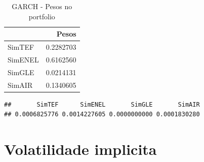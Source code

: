 \documentclass[
  12pt,
  a4paper,
  openany]{book}
\newenvironment{Shaded}{\begin{snugshade}}{\end{snugshade}}
\newcommand{\DataTypeTok}[1]{\textcolor[rgb]{0.13,0.29,0.53}{#1}}
\newcommand{\DecValTok}[1]{\textcolor[rgb]{0.00,0.00,0.81}{#1}}
\newcommand{\FloatTok}[1]{\textcolor[rgb]{0.00,0.00,0.81}{#1}}
\newcommand{\KeywordTok}[1]{\textcolor[rgb]{0.13,0.29,0.53}{\textbf{#1}}}
\newcommand{\NormalTok}[1]{#1}
\newcommand{\OperatorTok}[1]{\textcolor[rgb]{0.81,0.36,0.00}{\textbf{#1}}}
\newcommand{\StringTok}[1]{\textcolor[rgb]{0.31,0.60,0.02}{#1}}
\begin{document}
\normalsize

\begin{table}[!h]

\caption{\label{tab:unnamed-chunk-46}GARCH - Pesos no portfolio}
\centering
\begin{tabular}[t]{lr}
\toprule
  & Pesos\\
\midrule
SimTEF & 0.2282703\\
SimENEL & 0.6162560\\
SimGLE & 0.0214131\\
SimAIR & 0.1340605\\
\bottomrule
\end{tabular}
\end{table}

\scriptsize

\begin{Shaded}
\end{Shaded}

\begin{verbatim}
##       SimTEF      SimENEL       SimGLE       SimAIR 
## 0.0006825776 0.0014227605 0.0000000000 0.0001830280
\end{verbatim}

\begin{Shaded}
\end{Shaded}

\normalsize

\hypertarget{volatilidade-implicita}{%
\section{Volatilidade implicita}\label{volatilidade-implicita}}
\end{document}
